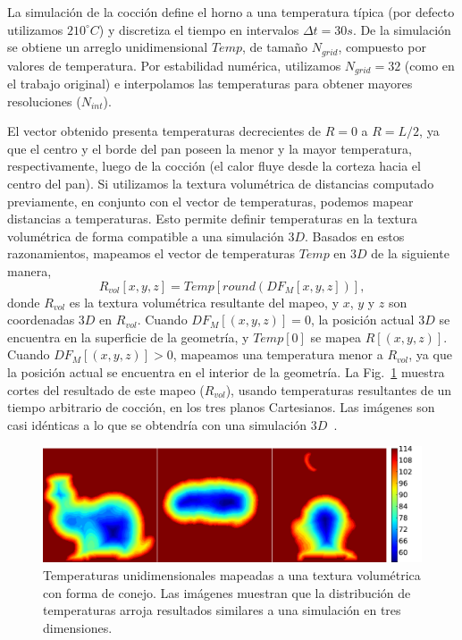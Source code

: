 La simulación de la cocción define el horno a una temperatura típica (por defecto utilizamos $210^{\circ}C$) y discretiza el tiempo en intervalos $\Delta t = 30s$.
De la simulación se obtiene un arreglo unidimensional $Temp$, de tamaño $N_{grid}$, compuesto por valores de temperatura.
Por estabilidad numérica, utilizamos $N_{grid}=32$ (como en el trabajo original) e interpolamos las temperaturas para obtener mayores resoluciones ($N_{int}$). 

El vector obtenido presenta temperaturas decrecientes de $R = 0$ a $R = L/2$, ya que el centro y el borde del pan poseen la menor y la mayor temperatura, respectivamente, luego de la cocción (el calor fluye desde la corteza hacia el centro del pan). 
Si utilizamos la textura volumétrica de distancias computado previamente, en conjunto con el vector de temperaturas, podemos mapear distancias a temperaturas.
Esto permite definir temperaturas en la textura volumétrica de forma compatible a una simulación $3D$.
Basados en estos razonamientos, mapeamos el vector de temperaturas $Temp$ en $3D$ de la siguiente manera,
\begin{equation*}
\displaystyle R_{vol}[x,y,z] = Temp[ round( DF_{M}[x,y,z] ) ], 
\end{equation*}
%
\noindent donde $R_{vol}$ es la textura volumétrica resultante del mapeo, y $x$, $y$ y $z$ son coordenadas $3D$ en $R_{vol}$. Cuando $DF_{M}[(x,y,z)] = 0$, la posición actual $3D$ se encuentra en la superficie de la geometría, y $Temp[0]$ se mapea $R[(x,y,z)]$.
Cuando $DF_{M}[(x,y,z)] > 0$, mapeamos una temperatura menor a $R_{vol}$, ya que la posición actual se encuentra en el interior de la geometría.
La Fig.~\ref{fg:baking} muestra cortes del resultado de este mapeo ($R_{vol}$), usando temperaturas resultantes de un tiempo arbitrario de cocción, en los tres planos Cartesianos. 
Las imágenes son casi idénticas a lo que se obtendría con una simulación $3D$~\cite{Purlis2010}.

\begin{figure}
\includegraphics[width=13cm]{figures/tempsbunny}
\caption[Temperaturas unidimensionales mapeadas a una textura volumétrica con forma de conejo]{Temperaturas unidimensionales mapeadas a una textura volumétrica con forma de conejo. Las imágenes muestran que la distribución de temperaturas arroja resultados similares a una simulación en tres dimensiones.}
\label{fg:baking}
\end{figure}

